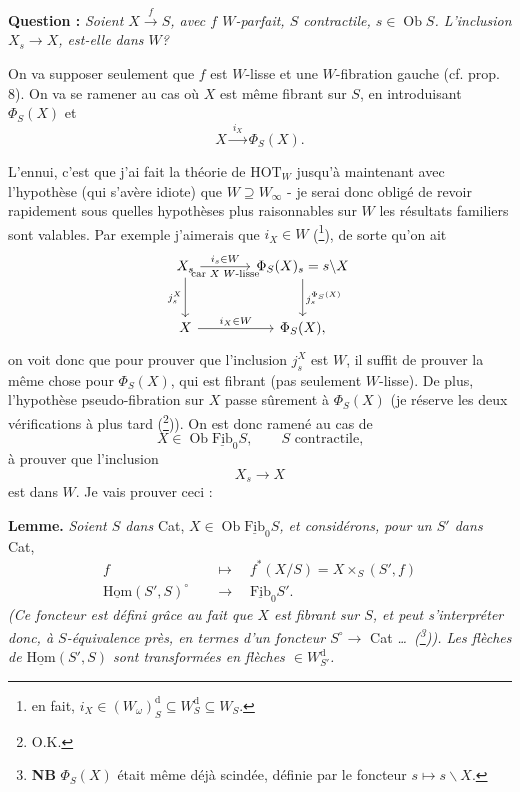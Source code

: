 \documentclass[11pt,leqno]{article}
\newcommand{\printedpage}[1]{\marginpar{\footnotesize p.~#1}}
\newcommand{\msp}[1]{\marginpar{\footnotesize [#1]}}
\newcommand{\fl}{\longrightarrow}
\newcommand{\uHom}{\underline{\mathrm{Hom}}}
\newcommand{\uFib}{\underline{\mathrm{Fib}}}
\newcommand{\Ob}{\operatorname{Ob}}
\newcommand{\HOT}{\mathrm{HOT}}
\begin{document}
\textbf{Question :} \textit{Soient $X\xrightarrow{\ f\ }S$, avec $f$ $W$-parfait, $S$ contractile, $s\in\Ob S$. L'inclusion $X_s\fl X$, est-elle dans $W$?}

\printedpage{32}
\msp{page 43}On va supposer seulement que $f$ est $W$-lisse et une $W$-fibration gauche (cf. prop. 8). On va se ramener au cas où $X$ est même fibrant sur $S$, en introduisant $\Phi_S(X)$ et %
\[ X\xrightarrow{\ i_X\ }\Phi_S(X). \]

L'ennui, c'est que j'ai fait la théorie de $\HOT_W$ jusqu'à maintenant avec l'hypothèse (qui s'avère idiote) que $W\supseteq W_\infty$ - je serai donc obligé de revoir rapidement sous quelles hypothèses plus raisonnables sur $W$ les résultats familiers sont valables. Par exemple j'aimerais que $i_X\in W$ (\footnote[50]{en fait, $i_X\in(W_\omega)^{\mathrm{d}}_S\subseteq W^{\mathrm{d}}_S\subseteq W_S$.}), de sorte qu'on ait
\[
\begin{tikzcd}[column sep=large, row sep=large]
X_s \arrow[r, "i_s\in W", "\text{car $X$ $W$-lisse}"'] \arrow[d, "j^X_s"'] & \Phi_S(X)_s=s\backslash X \arrow[d, "j_s^{\Phi_S(X)}"] \\
X \arrow[r, "i_X\in W"] & \Phi_S(X),
\end{tikzcd}
\]
on voit donc que pour prouver que l'inclusion $j^X_s$ est $W$, il suffit de prouver la même chose pour $\Phi_S(X)$, qui est fibrant (pas seulement $W$-lisse). De plus, l'hypothèse pseudo-fibration sur $X$ passe sûrement à $\Phi_S(X)$ (je réserve les deux vérifications à plus tard (\footnote[51]{O.K.})). On est donc ramené au cas de
\[ X\in\Ob\uFib_0S, \qquad S\text{ contractile,} \]
à prouver que l'inclusion
\[ X_s\fl X \]
\msp{page 44}est dans $W$. Je vais prouver ceci :

\textbf{Lemme.} \textit{Soient $S$ dans} Cat, \textit{$X\in\Ob\uFib_0S$, et considérons, pour un $S'$ dans} Cat,
\[
\begin{aligned}
f &\quad\longmapsto\quad f^*(X/S)=X\times_S(S',f)\\
\uHom(S',S)^{\circ} &\quad\longrightarrow\quad \uFib_0S'.
\end{aligned}
\]
\textit{(Ce foncteur est défini grâce au fait que $X$ est fibrant sur $S$, et peut s'interpréter donc, à $S$-équivalence près, en termes d'un foncteur $S^{\circ}\fl$} Cat \textit{\dots\ (\footnote[52]{\textbf{NB} $\Phi_S(X)$ était même déjà scindée, définie par le foncteur $s\longmapsto s\backslash X$.})). Les flèches de $\uHom(S',S)$ sont transformées en flèches $\in W^{\mathrm{d}}_{S'}$.}
\end{document}
